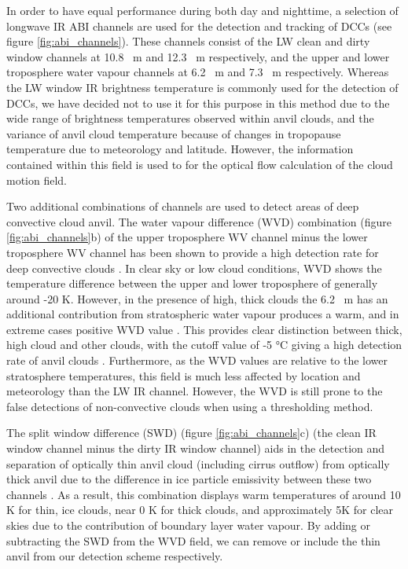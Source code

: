 \documentclass[amt, manuscript]{copernicus}
\begin{document}
In order to have equal performance during both day and nighttime, a selection of longwave IR ABI channels are used for the detection and tracking of DCCs (see figure \ref{fig:abi_channels}). 
These channels consist of the LW clean and dirty window channels at 10.8 \unit{\mu m} and 12.3 \unit{\mu m} respectively, and the upper and lower troposphere water vapour channels at 6.2 \unit{\mu m} and 7.3 \unit{\mu m} respectively.
Whereas the LW window IR brightness temperature is commonly used for the detection of DCCs, we have decided not to use it for this purpose in this method due to the wide range of brightness temperatures observed within anvil clouds, and the variance of anvil cloud temperature because of changes in tropopause temperature due to meteorology and latitude.
However, the information contained within this field is used to for the optical flow calculation of the cloud motion field.

Two additional combinations of channels are used to detect areas of deep convective cloud anvil. 
The water vapour difference (WVD) combination (figure \ref{fig:abi_channels}b) of the upper troposphere WV channel minus the lower troposphere WV channel has been shown to provide a high detection rate for deep convective clouds \citep{muller_role_2018, muller_novel_2019}.
In clear sky or low cloud conditions, WVD shows the temperature difference between the upper and lower troposphere of generally around -20 K. 
However, in the presence of high, thick clouds the 6.2 \unit{\mu m} has an additional contribution from stratospheric water vapour produces a warm, and in extreme cases positive WVD value \citep{schmetz_monitoring_1997}.
This provides clear distinction between thick, high cloud and other clouds, with the cutoff value of -5 °C giving a high detection rate of anvil clouds \citep{muller_novel_2019}. 
Furthermore, as the WVD values are relative to the lower stratosphere temperatures, this field is much less affected by location and meteorology than the LW IR channel.
However, the WVD is still prone to the false detections of non-convective clouds when using a thresholding method.

The split window difference (SWD) (figure \ref{fig:abi_channels}c) (the clean IR window channel minus the dirty IR window channel) aids in the detection and separation of optically thin anvil cloud (including cirrus outflow) from optically thick anvil due to the difference in ice particle emissivity between these two channels \citep{heidinger_gazing_2009}.
As a result, this combination displays warm temperatures of around 10 \unit{K} for thin, ice clouds, near 0 \unit{K} for thick clouds, and approximately 5\unit{K} for clear skies due to the contribution of boundary layer water vapour.
By adding or subtracting the SWD from the WVD field, we can remove or include the thin anvil from our detection scheme respectively.
\end{document}
